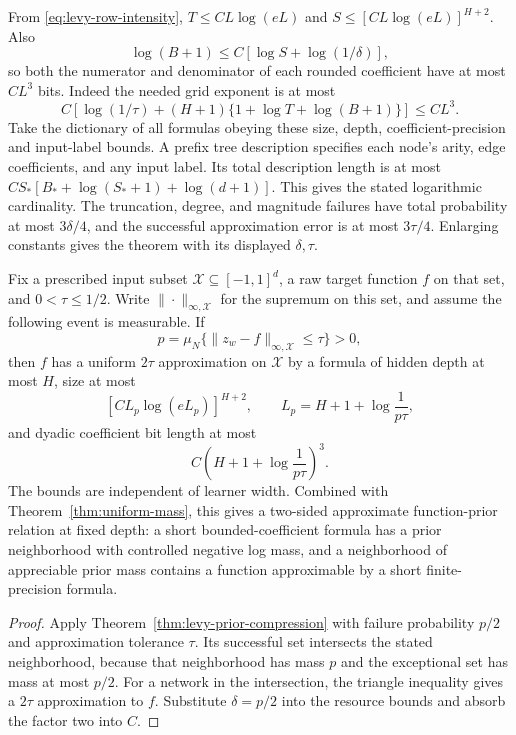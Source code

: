 From \eqref{eq:levy-row-intensity}, $T\le CL\log(eL)$ and $S\le[CL\log(eL)]^{H+2}$. Also
\[
 \log(B+1)\le C[\log S+\log(1/\delta)],
\]
so both the numerator and denominator of each rounded coefficient have at most $CL^3$ bits. Indeed the needed grid exponent is at most
\[
 C\left[\log(1/\tau)+(H+1)
                 \{1+\log T+\log(B+1)\}\right]\le CL^3.
\]
Take the dictionary of all formulas obeying these size, depth, coefficient-precision and input-label bounds. A prefix tree description specifies each node's arity, edge coefficients, and any input label. Its total description length is at most
$C S_*[B_*+\log(S_*+1)+\log(d+1)]$.
This gives the stated logarithmic cardinality. The truncation, degree, and magnitude failures have total probability at most $3\delta/4$, and the successful approximation error is at most $3\tau/4$. Enlarging constants gives the theorem with its displayed $\delta,\tau$.

\begin{corollary}
\label{cor:levy-prior-complexity-converse}
Fix a prescribed input subset $\mathcal X\subseteq[-1,1]^d$, a raw target function $f$ on that set, and $0<\tau\le1/2$. Write $\|\cdot\|_{\infty,\mathcal X}$ for the supremum on this set, and assume the following event is measurable. If
\[
 p=\mu_N\{\|z_w-f\|_{\infty,\mathcal X}\le\tau\}>0,
\]
then $f$ has a uniform $2\tau$ approximation on $\mathcal X$ by a formula of hidden depth at most $H$, size at most
\[
 [C L_p\log(eL_p)]^{H+2},\qquad L_p=H+1+\log\frac1{p\tau},
\]
and dyadic coefficient bit length at most
\[
 C\left(H+1+\log\frac1{p\tau}\right)^3.
\]
The bounds are independent of learner width. Combined with Theorem~\ref{thm:uniform-mass}, this gives a two-sided approximate function-prior relation at fixed depth: a short bounded-coefficient formula has a prior neighborhood with controlled negative log mass, and a neighborhood of appreciable prior mass contains a function approximable by a short finite-precision formula.
\end{corollary}
\begin{proof}
Apply Theorem~\ref{thm:levy-prior-compression} with failure probability $p/2$ and approximation tolerance $\tau$. Its successful set intersects the stated neighborhood, because that neighborhood has mass $p$ and the exceptional set has mass at most $p/2$. For a network in the intersection, the triangle inequality gives a $2\tau$ approximation to $f$. Substitute $\delta=p/2$ into the resource bounds and absorb the factor two into $C$.
\end{proof}

